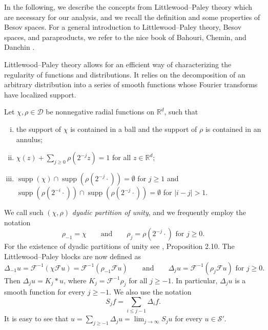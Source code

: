 \documentclass[11pt,a4paper]{article}
\newcommand{\cdummy}{\cdot}
\newcommand{\nocomma}{}
\newcommand{\tmop}[1]{\ensuremath{\operatorname{#1}}}
\newcommand{\tmtextit}[1]{{\itshape{#1}}}
\newenvironment{enumerateroman}{\begin{enumerate}[i.] }{\end{enumerate}}
\theoremstyle{remark}
\newcommand{\CD}{\ensuremath{\mathscr{D}}}
\newcommand{\CF}{\ensuremath{\mathscr{F}}}
\newcommand{\CS}{\ensuremath{\mathscr{S}}}
\begin{document}
In the following, we describe the concepts from Littlewood--Paley theory which are necessary for our analysis, and we recall the definition and some properties of Besov spaces. For a general introduction to Littlewood--Paley theory, Besov spaces, and paraproducts, we refer to the nice book of Bahouri, Chemin, and Danchin {\cite{Bahouri2011}}.

Littlewood--Paley theory allows for an efficient way of characterizing the regularity of functions and distributions. It relies on the decomposition of an arbitrary distribution into a series of smooth functions whose Fourier transforms have localized support.

Let $\chi \nocomma , \rho \in \CD$ be nonnegative radial functions on $\mathbb{R}^{d}$, such that
\begin{enumerateroman}
  \item the support of $\chi$ is contained in a ball and the support of $\rho$ is contained in an annulus;
  
  \item $\chi ( z ) + \sum_{j \geqslant 0} \rho ( 2^{-j} z ) =1$ for all $z \in \mathbb{R}^{d}$;
  
  \item \label{def:dyadic partition3}$\tmop{supp} ( \chi ) \cap \tmop{supp} (\rho ( 2^{-j} \cdummy ) ) = \emptyset$ for $j \geqslant 1$ and $\tmop{supp}( \rho ( 2^{-i} \cdummy ) ) \cap \tmop{supp} ( \rho ( 2^{-j} \cdummy ) ) =  \emptyset$ for $| i-j | >1$.
\end{enumerateroman}
We call such $( \chi , \rho )$ \tmtextit{dyadic partition of unity}, and we frequently employ the notation
\[
   \rho_{-1} = \chi \qquad \text{and} \qquad \rho_{j} = \rho (2^{-j} \cdummy ) \text{ for } j \geqslant 0.
\]
For the existence of dyadic partitions of unity see {\cite{Bahouri2011}}, Proposition 2.10. The Littlewood--Paley blocks are now defined as
\[
   \Delta_{-1} u= \CF^{-1} \left( \chi \CF u \right) = \CF^{-1} \left( \rho_{-1} \CF u \right) \qquad \text{and} \qquad \Delta_{j} u= \CF^{-1} \left( \rho_{j} \CF u \right) \text{ for }  j \geqslant 0. 
\]
Then $\Delta_{j} u=K_{j} \ast u$, where $K_{j} = \CF^{-1} \rho_{j}$ for all $j \geqslant -1$. In particular, $\Delta_{j} u$ is a smooth function for every $j \geqslant -1$. We also use the notation
\[
   S_{j} f= \sum_{i \leqslant j-1} \Delta_{i} f.
\]
It is easy to see that $u =  \sum_{j \geqslant -1} \Delta_{j} u= \lim_{j \rightarrow \infty} S_{j} u$ for every $u \in \CS'$.
\end{document}
